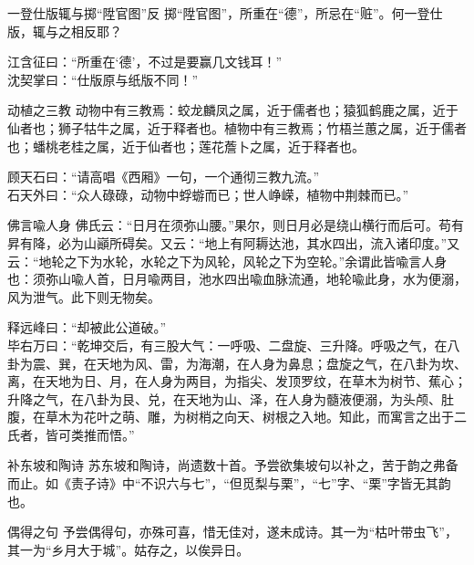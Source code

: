 \begin{yulu}{一登仕版辄与掷“陞官图”反}
掷“陞官图”，所重在“德”，所忌在“赃”。何一登仕版，辄与之相反耶？
\begin{comments}
江含征曰：“所重在‘德’，不过是要赢几文钱耳！” \\
沈契掌曰：“仕版原与纸版不同！”
\end{comments}
\end{yulu}

\begin{yulu}{动植之三教}
动物中有三教焉：蛟龙麟凤之属，近于儒者也；猿狐鹤鹿之属，近于仙者也；狮子牯牛之属，近于释者也。植物中有三教焉；竹梧兰蕙之属，近于儒者也；蟠桃老桂之属，近于仙者也；莲花薝卜之属，近于释者也。
\begin{comments}
顾天石曰：“请高唱《西厢》一句，一个通彻三教九流。” \\
石天外曰：“众人碌碌，动物中蜉蝣而已；世人峥嵘，植物中荆棘而已。”
\end{comments}
\end{yulu}

\begin{yulu}{佛言喩人身}
佛氏云：“日月在须弥山腰。”果尔，则日月必是绕山横行而后可。苟有昇有降，必为山巓所碍矣。又云：“地上有阿耨达池，其水四出，流入诸印度。”又云：“地轮之下为水轮，水轮之下为风轮，风轮之下为空轮。”余谓此皆喩言人身也：须弥山喩人首，日月喩两目，池水四出喩血脉流通，地轮喩此身，水为便溺，风为泄气。此下则无物矣。
\begin{comments}
释远峰曰：“却被此公道破。” \\
毕右万曰：“乾坤交后，有三股大气：一呼吸、二盘旋、三升降。呼吸之气，在八卦为震、巽，在天地为风、雷，为海潮，在人身为鼻息；盘旋之气，在八卦为坎、离，在天地为日、月，在人身为两目，为指尖、发顶罗纹，在草木为树节、蕉心；升降之气，在八卦为艮、兑，在天地为山、泽，在人身为髓液便溺，为头颅、肚腹，在草木为花叶之萌、雕，为树梢之向天、树根之入地。知此，而寓言之出于二氏者，皆可类推而悟。”
\end{comments}
\end{yulu}

\begin{yulu}{补东坡和陶诗}
苏东坡和陶诗，尚遗数十首。予尝欲集坡句以补之，苦于韵之弗备而止。如《责子诗》中“不识六与七”，“但觅梨与栗”，“七”字、“栗”字皆无其韵也。
\begin{comments}

\end{comments}
\end{yulu}

\begin{yulu}{偶得之句}
予尝偶得句，亦殊可喜，惜无佳对，遂未成诗。其一为“枯叶带虫飞”，其一为“乡月大于城”。姑存之，以俟异日。
\begin{comments}

\end{comments}
\end{yulu}

